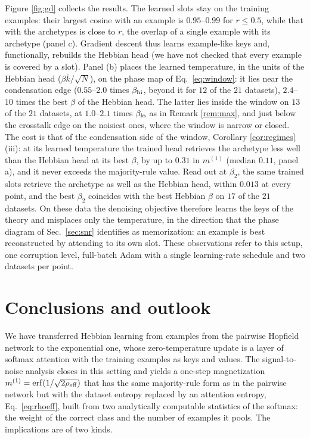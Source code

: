 \documentclass[11pt,a4paper]{article}
\newcommand{\erf}{\mathrm{erf}}
\begin{document}
Figure \ref{fig:gd} collects the results. The learned slots stay on the training examples: their largest cosine with an example is $0.95$--$0.99$ for $r\le0.5$, while that with the archetypes is close to $r$, the overlap of a single example with its archetype (panel c). Gradient descent thus learns example-like keys and, functionally, rebuilds the Hebbian head (we have not checked that every example is covered by a slot). Panel (b) places the learned temperature, in the units of the Hebbian head ($\beta\bar k/\sqrt N$), on the phase map of Eq.\ \eqref{eq:window}: it lies near the condensation edge ($0.55$--$2.0$ times $\beta_{\rm hi}$, beyond it for $12$ of the $21$ datasets), $2.4$--$10$ times the best $\beta$ of the Hebbian head. The latter lies inside the window on $13$ of the $21$ datasets, at $1.0$--$2.1$ times $\beta_{\rm lo}$ as in Remark \ref{rem:max}, and just below the crosstalk edge on the noisiest ones, where the window is narrow or closed. The cost is that of the condensation side of the window, Corollary \ref{cor:regimes}(iii): at its learned temperature the trained head retrieves the archetype less well than the Hebbian head at its best $\beta$, by up to $0.31$ in $m^{(1)}$ (median $0.11$, panel a), and it never exceeds the majority-rule value. Read out at $\beta_2$, the same trained slots retrieve the archetype as well as the Hebbian head, within $0.013$ at every point, and the best $\beta_2$ coincides with the best Hebbian $\beta$ on $17$ of the $21$ datasets. On these data the denoising objective therefore learns the keys of the theory and misplaces only the temperature, in the direction that the phase diagram of Sec.\ \ref{sec:snr} identifies as memorization: an example is best reconstructed by attending to its own slot. These observations refer to this setup, one corruption level, full-batch Adam with a single learning-rate schedule and two datasets per point.

\section{Conclusions and outlook}

We have transferred Hebbian learning from examples \cite{Agliari2022concept,Alemanno2023} from the pairwise Hopfield network to the exponential one, whose zero-temperature update is a layer of softmax attention with the training examples as keys and values. The signal-to-noise analysis closes in this setting and yields a one-step magnetization $m^{(1)}=\erf(1/\sqrt{2\rho_{\rm eff}})$ that has the same majority-rule form as in the pairwise network but with the dataset entropy replaced by an attention entropy, Eq.\ \eqref{eq:rhoeff}, built from two analytically computable statistics of the softmax: the weight of the correct class and the number of examples it pools. The implications are of two kinds.
\end{document}
